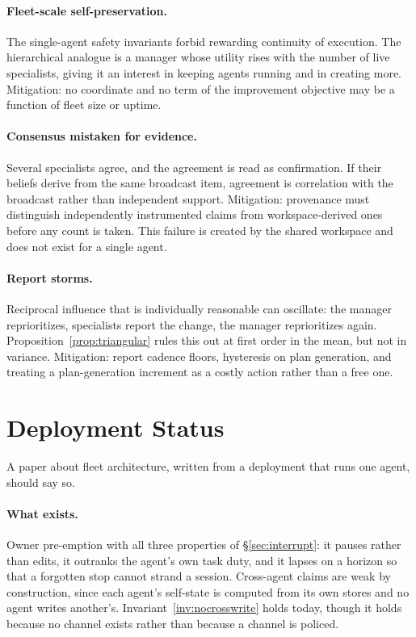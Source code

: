 \documentclass[11pt]{article}
\begin{document}
\paragraph{Fleet-scale self-preservation.} The single-agent safety invariants forbid rewarding continuity of execution. The hierarchical analogue is a manager whose utility rises with the number of live specialists, giving it an interest in keeping agents running and in creating more. Mitigation: no coordinate and no term of the improvement objective may be a function of fleet size or uptime.

\paragraph{Consensus mistaken for evidence.} Several specialists agree, and the agreement is read as confirmation. If their beliefs derive from the same broadcast item, agreement is correlation with the broadcast rather than independent support. Mitigation: provenance must distinguish independently instrumented claims from workspace-derived ones before any count is taken. This failure is created by the shared workspace and does not exist for a single agent.

\paragraph{Report storms.} Reciprocal influence that is individually reasonable can oscillate: the manager reprioritizes, specialists report the change, the manager reprioritizes again. Proposition~\ref{prop:triangular} rules this out at first order in the mean, but not in variance. Mitigation: report cadence floors, hysteresis on plan generation, and treating a plan-generation increment as a costly action rather than a free one.

\section{Deployment Status}
\label{sec:deployment}

A paper about fleet architecture, written from a deployment that runs one agent, should say so.

\paragraph{What exists.} Owner pre-emption with all three properties of \S\ref{sec:interrupt}: it pauses rather than edits, it outranks the agent's own task duty, and it lapses on a horizon so that a forgotten stop cannot strand a session. Cross-agent claims are weak by construction, since each agent's self-state is computed from its own stores and no agent writes another's. Invariant~\ref{inv:nocrosswrite} holds today, though it holds because no channel exists rather than because a channel is policed.
\end{document}

